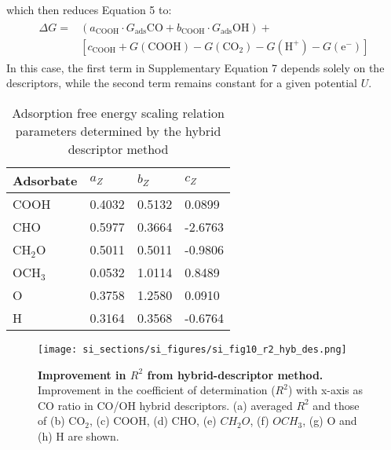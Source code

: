 which then reduces Equation 5 to:
\begin{align}
  \begin{split}
    \Delta G = &(a_{\text{COOH}} \cdot G_{\text{ads}}{\mathrm{CO}} + b_{\text{COOH}} \cdot G_{\text{ads}}{\mathrm{OH}}) + \\
    &[c_{\text{COOH}} + G(\mathrm{COOH}) - G(\mathrm{CO}_2) - G(\mathrm{H}^+) - G(\mathrm{e}^-)]
  \end{split}
\end{align}
In this case, the first term in Supplementary Equation 7 depends solely on the descriptors, while the second term remains constant for a given potential $U$.


\begin{table}[h]
  \centering
  {\fontsize{10}{12}\selectfont
  \begin{tabular}{*{4}{l}}
    \hline
    \textbf{Adsorbate} & \textbf{$a_Z$}  & \textbf{$b_Z$}  & \textbf{$c_Z$}   \\
    \hline
    COOH      & 0.4032 & 0.5132 & 0.0899  \\
    CHO       & 0.5977 & 0.3664 & -2.6763 \\
    CH$_2$O   & 0.5011 & 0.5011 & -0.9806 \\
    OCH$_3$   & 0.0532 & 1.0114 & 0.8489  \\
    O         & 0.3758 & 1.2580 & 0.0910  \\
    H         & 0.3164 & 0.3568 & -0.6764 \\
    \hline
  \end{tabular}
  }
  \caption{Adsorption free energy scaling relation parameters determined by the hybrid descriptor method}
  \label{si_table13}
\end{table}


\begin{figure}
  \centering
  \texttt{[image: si\_sections/si\_figures/si\_fig10\_r2\_hyb\_des.png]}
  \caption{\textbf{Improvement in $R^2$ from hybrid-descriptor method.}
  Improvement in the coefficient of determination ($R^2$) with x-axis as CO ratio in CO/OH hybrid descriptors.
  (a) averaged $R^2$ and those of (b) CO$_2$, (c) COOH, (d) CHO, (e) $CH_2O$, (f) $OCH_3$, (g) O and (h) H are shown.}
  \label{si_fig10:r2_hyb_des}
\end{figure}


